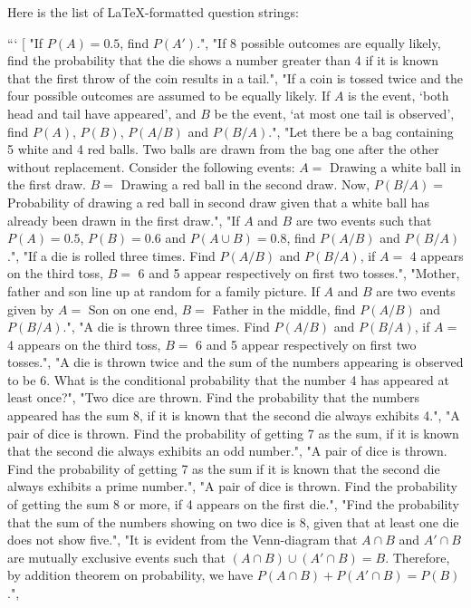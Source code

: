 Here is the list of LaTeX-formatted question strings:

```
[
"If $P(A) = 0.5$, find $P(A')$.",
"If 8 possible outcomes are equally likely, find the probability that the die shows a number greater than 4 if it is known that the first throw of the coin results in a tail.",
"If a coin is tossed twice and the four possible outcomes are assumed to be equally likely. If $A$ is the event, ‘both head and tail have appeared', and $B$ be the event, ‘at most one tail is observed', find $P(A)$, $P(B)$, $P(A/B)$ and $P(B/A)$.",
"Let there be a bag containing 5 white and 4 red balls. Two balls are drawn from the bag one after the other without replacement. Consider the following events: $A = $ Drawing a white ball in the first draw. $B = $ Drawing a red ball in the second draw. Now, $P(B/A) = $ Probability of drawing a red ball in second draw given that a white ball has already been drawn in the first draw.",
"If $A$ and $B$ are two events such that $P(A) = 0.5$, $P(B) = 0.6$ and $P(A \cup B) = 0.8$, find $P(A/B)$ and $P(B/A)$.",
"If a die is rolled three times. Find $P(A/B)$ and $P(B/A)$, if $A = $ 4 appears on the third toss, $B = $ 6 and 5 appear respectively on first two tosses.",
"Mother, father and son line up at random for a family picture. If $A$ and $B$ are two events given by $A = $ Son on one end, $B = $ Father in the middle, find $P(A/B)$ and $P(B/A)$.",
"A die is thrown three times. Find $P(A/B)$ and $P(B/A)$, if $A = $ 4 appears on the third toss, $B = $ 6 and 5 appear respectively on first two tosses.",
"A die is thrown twice and the sum of the numbers appearing is observed to be 6. What is the conditional probability that the number 4 has appeared at least once?",
"Two dice are thrown. Find the probability that the numbers appeared has the sum 8, if it is known that the second die always exhibits 4.",
"A pair of dice is thrown. Find the probability of getting 7 as the sum, if it is known that the second die always exhibits an odd number.",
"A pair of dice is thrown. Find the probability of getting 7 as the sum if it is known that the second die always exhibits a prime number.",
"A pair of dice is thrown. Find the probability of getting the sum 8 or more, if 4 appears on the first die.",
"Find the probability that the sum of the numbers showing on two dice is 8, given that at least one die does not show five.",
"It is evident from the Venn-diagram that $A \cap B$ and $A' \cap B$ are mutually exclusive events such that $(A \cap B) \cup (A' \cap B) = B$. Therefore, by addition theorem on probability, we have $P(A \cap B) + P(A' \cap B) = P(B)$.",
